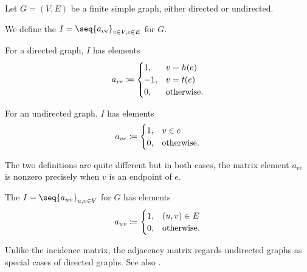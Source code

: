 \begin{definition}\label{def:graph_matrices}
  Let \( G = (V, E) \) be a finite simple graph, either directed or undirected.
  \begin{thmenum}
     We define the  \( I = \seq{ a_{ve} }_{v \in V, e \in E} \) for \( G \).

    \begin{minipage}[t]{0.45\textwidth}
      For a directed graph, \( I \) has elements
      \begin{equation*}
        a_{ve} \coloneqq \begin{cases}
          1,  & v = h(e) \\
          -1, & v = t(e) \\
          0,  & \T{otherwise.}
        \end{cases}
      \end{equation*}
    \end{minipage}
    \hspace{0.02\textwidth}
    \begin{minipage}[t]{0.45\textwidth}
      For an undirected graph, \( I \) has elements
      \begin{equation*}
        a_{ve} \coloneqq \begin{cases}
          1,  & v \in e \\
          0,  & \T{otherwise.}
        \end{cases}
      \end{equation*}
    \end{minipage}

    The two definitions are quite different but in both cases, the matrix element \( a_{ve} \) is nonzero precisely when \( v \) is an endpoint of \( e \).

     The  \( I = \seq{ a_{uv} }_{u, v \in V} \) for \( G \) has elements
    \begin{equation*}
      a_{uv} \coloneqq \begin{cases}
        1,  & (u, v) \in E \\
        0,  & \T{otherwise.}
      \end{cases}
    \end{equation*}

    Unlike the incidence matrix, the adjacency matrix regards undirected graphs as special cases of directed graphs. See also .
  \end{thmenum}
\end{definition}

